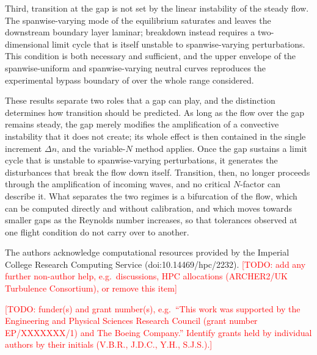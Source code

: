 \documentclass[lineno]{jfm}
\begin{document}
Third, transition at the gap is not set by the linear instability of the steady flow. The spanwise-varying mode of the equilibrium saturates and leaves the downstream boundary layer laminar; breakdown instead requires a two-dimensional limit cycle that is itself unstable to spanwise-varying perturbations. This condition is both necessary and sufficient, and the upper envelope of the spanwise-uniform and spanwise-varying neutral curves reproduces the experimental bypass boundary of \citet{jeffGaps} over the whole range considered.

These results separate two roles that a gap can play, and the distinction determines how transition should be predicted. As long as the flow over the gap remains steady, the gap merely modifies the amplification of a convective instability that it does not create; its whole effect is then contained in the single increment $\Delta n$, and the variable-$N$ method \citep{crouchKosoryginNg2006,crouch2021predicting} applies. Once the gap sustains a limit cycle that is unstable to spanwise-varying perturbations, it generates the disturbances that break the flow down itself. Transition, then, no longer proceeds through the amplification of incoming waves, and no critical $N$-factor can describe it. What separates the two regimes is a bifurcation of the flow, which can be computed directly and without calibration, and which moves towards smaller gaps as the Reynolds number increases, so that tolerances observed at one flight condition do not carry over to another.

\providecommand{\todo}[1]{\textcolor{red}{[TODO: #1]}}

\begin{bmhead}[Acknowledgements.]
The authors acknowledge computational resources provided by the Imperial College Research Computing Service (doi:10.14469/hpc/2232). \todo{add any further non-author help, e.g.\ discussions, HPC allocations (ARCHER2/UK Turbulence Consortium), or remove this item}
\end{bmhead}

\begin{bmhead}[Funding.]
\todo{funder(s) and grant number(s), e.g.\ ``This work was supported by the Engineering and Physical Sciences Research Council (grant number EP/XXXXXXX/1) and The Boeing Company.'' Identify grants held by individual authors by their initials (V.B.R., J.D.C., Y.H., S.J.S.).}
\end{bmhead}
\end{document}
